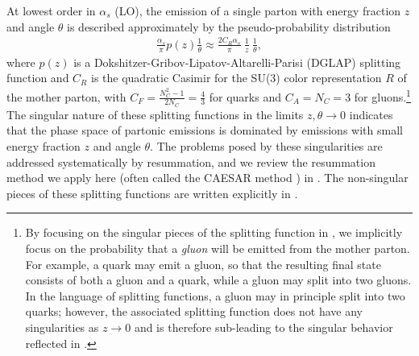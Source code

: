 \documentclass[letterpaper,11pt]{article}
\begin{document}
At lowest order in \(\alpha_s\) (LO), the emission of a single parton with energy fraction \(z\) and angle \(\theta\) is described approximately by the pseudo-probability distribution
\begin{align}
    \frac{\alpha_s}{\pi} p(z) \frac{1}{\theta}
    \approx
    \frac{2 C_R \alpha_s}{\pi}~\frac{1}{z}~\frac{1}{\theta},
    \label{eqn:dglap_approx}
\end{align}
where \(p(z)\) is a Dokshitzer-Gribov-Lipatov-Altarelli-Parisi (DGLAP) splitting function \cite{Gribov:1972ri,Dokshitzer:1977sg,Altarelli:1977zs} and \(C_R\) is the quadratic Casimir for the SU(3) color representation \(R\) of the mother parton, with \(C_F = \frac{N_C^2 - 1}{2 N_C} = \frac{4}{3}\) for quarks and \(C_A = N_C = 3\) for gluons.\footnote{
By focusing on the singular pieces of the splitting function in , we implicitly focus on the probability that a \textit{gluon} will be emitted from the mother parton.
%
For example, a quark may emit a gluon, so that the resulting final state consists of both a gluon and a quark, while a gluon may split into two gluons.
%
In the language of splitting functions, a gluon may in principle split into two quarks;
%
however, the associated splitting function does not have any singularities as \(z \to 0\) and is therefore sub-leading to the singular behavior reflected in .
}
%
The singular nature of these splitting functions in the limits \(z, \theta \to 0\) indicates that the phase space of partonic emissions is dominated by emissions with small energy fraction \(z\) and angle \(\theta\).
%
The problems posed by these singularities are addressed systematically by resummation, and we review the resummation method we apply here (often called the CAESAR method \cite{Banfi:2001bz,Banfi:2004yd}) in .
%
The non-singular pieces of these splitting functions are written explicitly in .
\end{document}
